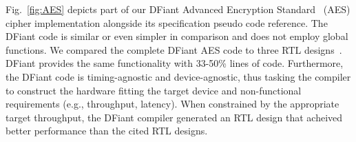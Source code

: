 Fig.~\ref{fig:AES} depicts part of our DFiant Advanced Encryption Standard~\cite{pub2001197} (AES) cipher implementation alongside its specification pseudo code reference. The DFiant code is similar or even simpler in comparison and does not employ global functions. We compared the complete DFiant AES code to three RTL designs~\cite{das2010fully}\cite{hsing2013aes}\cite{salah2013aespipe}. DFiant provides the same functionality with 33-50\% lines of code.
Furthermore, the DFiant code is timing-agnostic and device-agnostic, thus tasking the compiler to construct the hardware fitting the target device and non-functional requirements (e.g., throughput, latency). When constrained by the appropriate target throughput, the DFiant compiler generated an RTL design that acheived better performance than the cited RTL designs.



